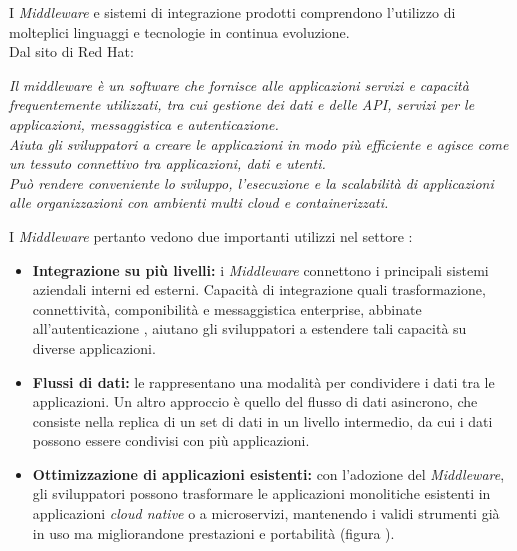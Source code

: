 I \textit{Middleware} e sistemi di integrazione prodotti comprendono l'utilizzo di molteplici linguaggi e tecnologie in continua evoluzione.\\
Dal sito di Red Hat:
\begin{displayquote}
  \textit{Il middleware è un software che fornisce alle applicazioni servizi e capacità frequentemente utilizzati, tra cui gestione dei dati e delle API, servizi per le applicazioni, messaggistica e autenticazione.\\
  Aiuta gli sviluppatori a creare le applicazioni in modo più efficiente e agisce come un tessuto connettivo tra applicazioni, dati e utenti.\\
  Può rendere conveniente lo sviluppo, l'esecuzione e la scalabilità di applicazioni alle organizzazioni con ambienti multi cloud e containerizzati.}
\end{displayquote}
\noindent
I \textit{Middleware} pertanto vedono due importanti utilizzi nel settore :
\begin{itemize}
  \item \textbf{Integrazione su più livelli:} i \textit{Middleware} connettono i principali sistemi aziendali interni ed esterni. Capacità di integrazione quali trasformazione, connettività, componibilità e messaggistica enterprise, abbinate all'autenticazione , aiutano gli sviluppatori a estendere tali capacità su diverse applicazioni.
  \item \textbf{Flussi di dati:} le  rappresentano una modalità per condividere i dati tra le applicazioni. Un altro approccio è quello del flusso di dati asincrono, che consiste nella replica di un set di dati in un livello intermedio, da cui i dati possono essere condivisi con più applicazioni.
  \item \textbf{Ottimizzazione di applicazioni esistenti:} con l'adozione del \textit{Middleware}, gli sviluppatori possono trasformare le applicazioni monolitiche esistenti in applicazioni \textit{cloud native} o a microservizi, mantenendo i validi strumenti già in uso ma migliorandone prestazioni e portabilità (figura \thefigure).
\end{itemize}

